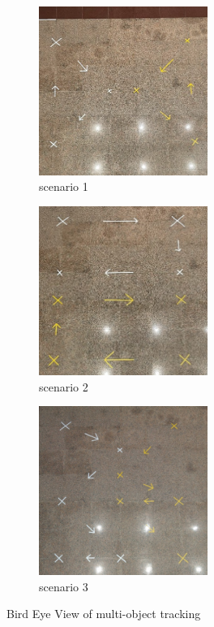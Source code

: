 \begin{figure}[!htb]
    \centering
    \begin{subfigure}{0.25\linewidth}
        \includegraphics[width=5.5cm]{Figures/scenario_1_gt.png}
        \caption{scenario 1}
        \label{subfig:scenario1gt}
    \end{subfigure}
    \hfill
    \begin{subfigure}{0.25\linewidth}
        \centering
        \includegraphics[width=5.5cm]{Figures/scenario_2_gt.png}
        \caption{scenario 2}
        \label{subfig:scenario2gt}
    \end{subfigure}
    \hfill
    \begin{subfigure}{0.25\linewidth}
        \centering
        \includegraphics[width=5.5cm]{Figures/scenario_3_gt.jpg}
        \caption{scenario 3}
        \label{subfig:scenario3gt}
    \end{subfigure}

    \caption{Bird Eye View of multi-object tracking}
    \label{fig:ground_truth}
\end{figure}

